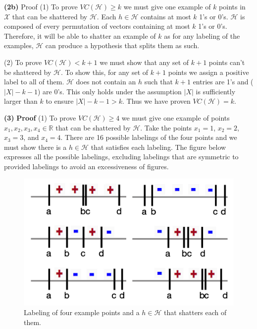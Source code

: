 \documentclass[11pt]{article}
\renewcommand\part[1]{\vspace{.10in}\textbf{(#1)}}
\begin{document}

\part{2b} {Proof} (1) To prove $VC(\mathcal{H}) \geq k$ we must give one example of $k$ points in $\mathcal{X}$ that can be shattered by $\mathcal{H}$. Each $h \in \mathcal{H}$ contains at most $k$ 1's or 0's. $\mathcal{H}$ is composed of every permutation of vectors containing at most $k$ 1's or 0's. Therefore, it will be able to shatter an example of $k$ as for any labeling of the examples, $\mathcal{H}$ can produce a hypothesis that splits them as such.

(2) To prove $VC(\mathcal{H}) < k + 1$ we must show that any set of $k + 1$ points can't be shattered by $\mathcal{H}$. To show this, for any set of $k + 1$ points we assign a positive label to all of them. $\mathcal{H}$ does not contain an $h$ such that $k + 1$ entries are 1's and ($|X| - k - 1$) are 0's. This only holds under the assumption $|X|$ is sufficiently larger than $k$ to ensure $|X| - k - 1 > k$. Thus we have proven $VC(\mathcal{H}) = k$.


\part{3} \textbf{Proof} (1) To prove $VC(\mathcal{H}) \geq 4$ we must give one example of points $x_1, x_2, x_3, x_4 \in \mathbb{R}$ that can be shattered by $\mathcal{H}$. Take the points $x_1 = 1$, $x_2 = 2$, $x_3 = 3$, and $x_4 = 4$. There are 16 possible labelings of the four points and we must show there is a $h \in \mathcal{H}$ that satisfies each labeling. The figure below expresses all the possible labelings, excluding labelings that are symmetric to provided labelings to avoid an excessiveness of figures.

\begin{figure}[H]
  \centerline{\includegraphics[width=0.5\linewidth]{image_2_3_1.png}}
  \caption{Labeling of four example points and a $h \in \mathcal{H}$ that shatters each of them.}
\end{figure}
\end{document}
